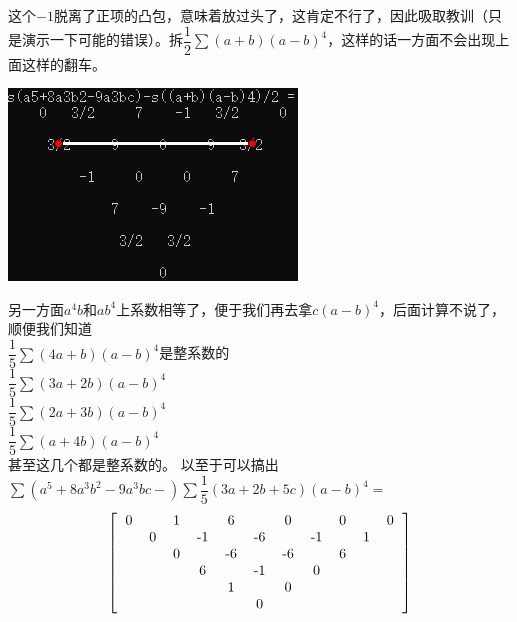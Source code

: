 \documentclass[UTF8]{ctexart}
\begin{document}
这个$ -1 $脱离了正项的凸包，意味着放过头了，这肯定不行了，因此吸取教训（只是演示一下可能的错误）。拆$ \dfrac{1}{2}\displaystyle \sum (a+b)(a-b)^4 $，这样的话一方面不会出现上面这样的翻车。
  \begin{center}
  	\includegraphics[width=0.4\linewidth]{200}
  \end{center}
另一方面$ a^{4}b $和$ ab^{4} $上系数相等了，便于我们再去拿$ c(a-b)^{4} $，后面计算不说了，顺便我们知道 \\
$ \dfrac{1}{5} \displaystyle \sum (4a+b)(a-b)^{4} $是整系数的\\
$ \dfrac{1}{5} \displaystyle \sum (3a+2b)(a-b)^{4} $\\
$ \dfrac{1}{5} \displaystyle \sum (2a+3b)(a-b)^{4} $\\
$ \dfrac{1}{5} \displaystyle \sum (a+4b)(a-b)^{4} $\\
甚至这几个都是整系数的。
以至于可以搞出$  \displaystyle \sum (a^{5}+8 a^{3} b^{2}-9a^{3}bc-) \displaystyle \sum \dfrac{1}{5}(3a+2b+5c)(a-b)^{4}= $
  \renewcommand*{\arraystretch}{1.732}\[\left[\begin{matrix}
  	\begin{tabular}{ccccccccccccc}
  		0& &1& &6& &0& &0& &0\\
  		&0& &-1& &-6& &-1& &1&\\
  		& &0& &-6& &-6& &6& &\\
  		& & &6& &-1& &0& & &\\
  		& & & &1& &0& & & &\\
  		& & & & &0& & & & &\\
  	\end{tabular}
  \end{matrix}\right]\]
\end{document}
